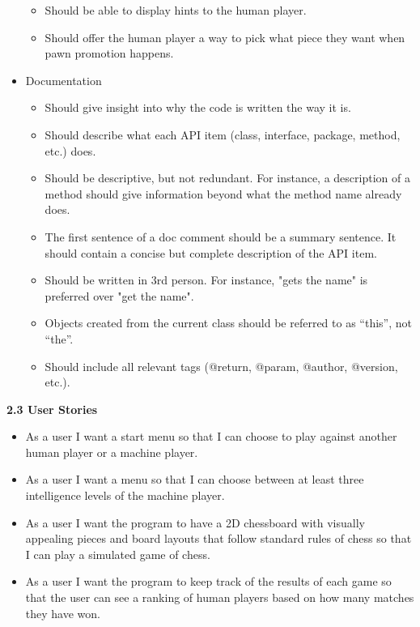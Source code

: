 \documentclass{article}
\begin{document}
\begin{flushleft}
\begin{itemize}
\begin{itemize}
		\item Should be able to display hints to the human player.
		\item Should offer the human player a way to pick what piece they want when pawn promotion happens.
	\end{itemize}
	\item Documentation
	\begin{itemize}
		\item Should give insight into why the code is written the way it is.
		\item Should describe what each API item (class, interface, package, method, etc.) does.
		\item Should be descriptive, but not redundant. For instance, a description of a method should give information beyond what the method name already does.
		\item The first sentence of a doc comment should be a summary sentence. It should contain a concise but complete description of the API item.
		\item Should be written in 3rd person. For instance, "gets the name" is preferred over "get the name".
		\item Objects created from the current class should be referred to as “this”, not “the”.
		\item Should include all relevant tags (@return, @param, @author, @version, etc.).
	\end{itemize}
\end{itemize}

\vspace{5mm}
\textbf{2.3	User Stories}\\
	\begin{itemize}
	
	\item As a user I want a start menu so that I can choose to play against another human player or a machine player.
	\item As a user I want a menu so that I can choose between at least three intelligence levels of the machine player.
	\item As a user I want the program to have a 2D chessboard with visually appealing pieces and board layouts that follow standard rules of chess so that I can play a simulated game of chess.
	\item As a user I want the program to keep track of the results of each game so that the user can see a ranking of human players based on how many matches they have won.


\end{itemize}
\end{flushleft}
\end{document}
